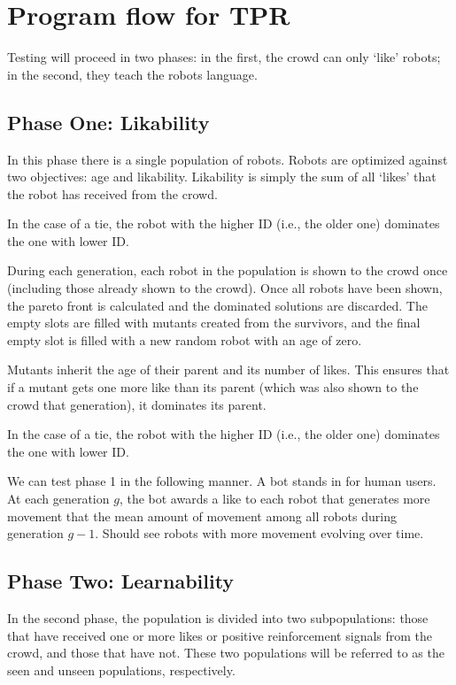 \documentclass[12pt]{article}
\begin{document}
\section{Program flow for TPR}

Testing will proceed in two phases:
in the first, the crowd can only `like' robots;
in the second, they teach the robots language.

\subsection{Phase One: Likability}

In this phase there is a single population
of robots. Robots are optimized against
two objectives: age and likability. Likability
is simply the sum of all `likes' that the
robot has received from the crowd.

In the case of a tie, the robot with the
higher ID (i.e., the older one) dominates
the one with lower ID.

During each generation, each robot in the population
is shown to the crowd once (including those already
shown to the crowd). Once all robots have been
shown, the pareto front is calculated and the
dominated solutions are discarded. The empty slots
are filled with mutants created from the survivors,
and the final empty slot is filled with a new
random robot with an age of zero.

Mutants inherit the age of their parent and
its number of likes. This ensures that if a mutant
gets one more like than its parent (which was
also shown to the crowd that generation), it
dominates its parent.

In the case of a tie, the robot with the
higher ID (i.e., the older one) dominates
the one with lower ID.

We can test phase 1 in the following manner.
A bot stands in for human users. At each generation
$g$, the bot awards a like to each robot that
generates more movement that the mean amount of
movement among all robots during generation $g-1$.
Should see robots with more movement evolving
over time.

\subsection{Phase Two: Learnability}

In the second phase, the population is divided
into two subpopulations: those that have received
one or more likes or positive reinforcement signals from
the crowd, and those that have not. These
two populations will be referred to as the
seen and unseen populations, respectively.
\end{document}
